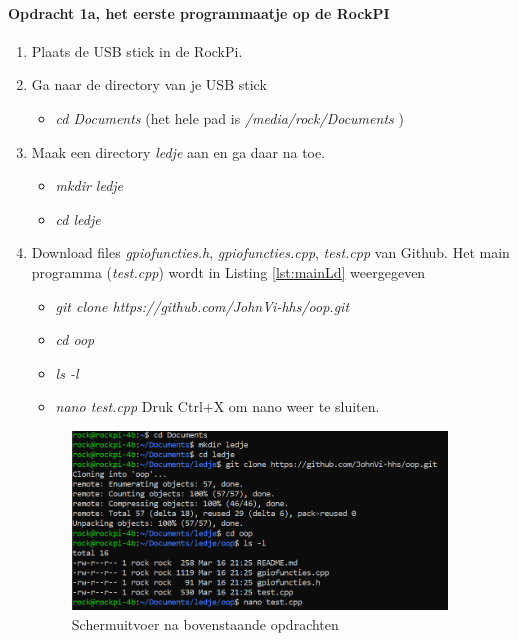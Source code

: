 \paragraph[Opdracht 1a]{Opdracht 1a, het eerste programmaatje op de RockPI}	

\begin{enumerate}
	\item Plaats de USB stick in de RockPi.
	\item Ga naar de directory van je USB stick
	\begin{itemize}
		\item \textit{cd Documents} (het hele pad is \textit{/media/rock/Documents} )
	\end{itemize}
    
    \item Maak een directory \textit{ledje} aan en ga daar na toe.
	\begin{itemize}
	    \item \textit{mkdir ledje}
	    \item \textit{cd ledje}
    \end{itemize}  
   \item Download files \textit{gpiofuncties.h}, \textit{gpiofuncties.cpp}, \textit{test.cpp} van Github. Het main programma (\textit{test.cpp}) wordt in Listing \ref{lst:mainLd} weergegeven
   	\begin{itemize}
     	\item \textit{git clone https://github.com/JohnVi-hhs/oop.git}
     	\item \textit{cd oop}
     	\item \textit{ls -l}
     	\item \textit{nano test.cpp} Druk Ctrl+X om nano weer te sluiten.
   \end{itemize}

\clearpage
\begin{figure}[h!]
	\centering
	\begin{center} 	
		\includegraphics[width=0.94\textwidth]{figuren/gitclone}
		\caption{Schermuitvoer na bovenstaande opdrachten}
		\label{fig:gitclone}   
	\end{center}
\end{figure}


\end{enumerate}

